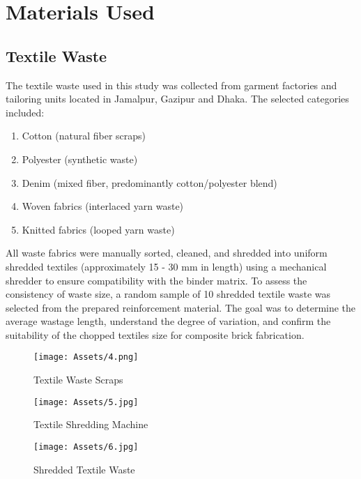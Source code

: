 \section{Materials Used }

\subsection{Textile Waste}
The textile waste used in this study was collected from garment factories and tailoring units located in Jamalpur, Gazipur and Dhaka. The selected categories included: 

\begin{enumerate}
    \item Cotton (natural fiber scraps)
    \item Polyester (synthetic waste)
    \item Denim (mixed fiber, predominantly cotton/polyester blend)
    \item Woven fabrics (interlaced yarn waste)
    \item Knitted fabrics (looped yarn waste)
\end{enumerate}

\noindent All waste fabrics were manually sorted, cleaned, and shredded into uniform shredded textiles (approximately 15 - 30 mm in length) using a mechanical shredder to ensure compatibility with the binder matrix. To assess the consistency of waste size, a random sample of 10 shredded textile waste was selected from the prepared reinforcement material. The goal was to determine the average wastage length, understand the degree of variation, and confirm the suitability of the chopped textiles size for composite brick fabrication.
\vspace{12pt}
\begin{figure}[H]
    \centering
    \texttt{[image: Assets/4.png]}
    \caption{Textile Waste Scraps}
    \label{fig:placeholder}
\end{figure}

\begin{figure}[H]
    \centering
    \texttt{[image: Assets/5.jpg]}
    \caption{Textile Shredding Machine}
    \label{fig:placeholder}
\end{figure}

\begin{figure}[H]
    \centering
    \texttt{[image: Assets/6.jpg]}
    \caption{Shredded Textile Waste}
    \label{fig:placeholder}
\end{figure}

